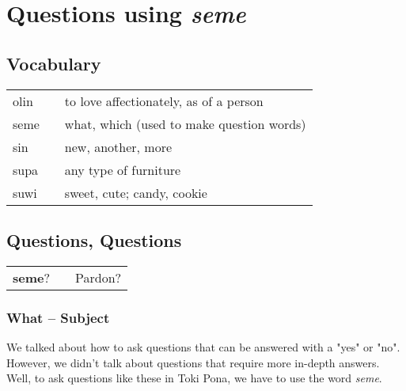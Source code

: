 \section{Questions using \textit{seme}}
\subsection*{Vocabulary}
%
\begin{supertabular}{p{5,5cm}|ll}
olin && to love affectionately, as of a person \\
seme && what, which (used to make question words) \\
sin && new, another, more \\
supa && any type of furniture \\
suwi && sweet, cute; candy, cookie \\
\end{supertabular} 
%
{}
\subsection*{Questions, Questions}
%
\begin{supertabular}{p{5,5cm}|ll}
\textbf{seme}? && Pardon? \\
\end{supertabular} 
%
\subsubsection*{What -- Subject}
%
We talked about how to ask questions that can be answered with a "yes" or "no". 
However, we didn't talk about questions that require more in-depth answers. 
Well, to ask questions like these in Toki Pona, we have to use the word \textit{seme}. 

